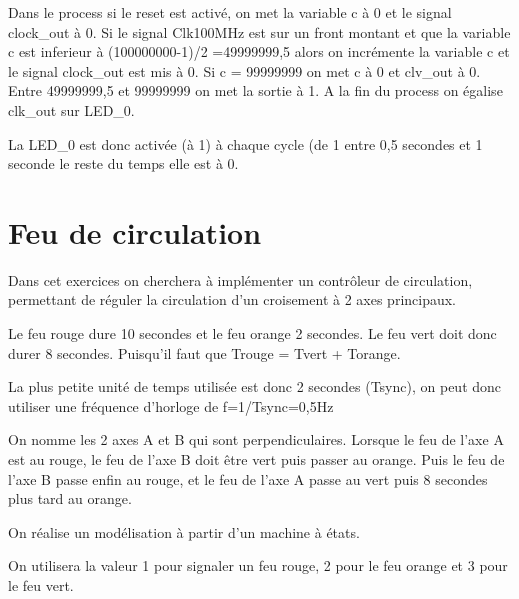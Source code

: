 \documentclass[11pt]{report}
\begin{document}
Dans le process si le reset est activé, on met la variable c à 0 et le signal clock\_out à 0. Si le signal Clk100MHz est sur un front montant et que la variable c est inferieur à (100000000-1)/2 =49999999,5 alors on incrémente la variable c et le signal clock\_out est mis à 0. Si c = 99999999 on met c à 0 et clv\_out à 0. Entre 49999999,5 et 99999999 on met la sortie à 1.
A la fin du process on égalise clk\_out sur LED\_0.

La LED\_0 est donc activée (à 1) à chaque cycle (de 1 entre 0,5 secondes et 1 seconde le reste du temps elle est à 0.


\section{Feu de circulation}

Dans cet exercices on cherchera à implémenter un contrôleur de circulation, permettant de réguler la circulation d'un croisement à 2 axes principaux.

Le feu rouge dure 10 secondes et le feu orange 2 secondes. Le feu vert doit donc durer 8 secondes. Puisqu'il faut que Trouge = Tvert + Torange.

La plus petite unité de temps utilisée est donc 2 secondes (Tsync), on  peut donc utiliser une fréquence d'horloge de f=1/Tsync=0,5Hz

On nomme les 2 axes A et B qui sont perpendiculaires. Lorsque le feu de l'axe A est au rouge, le feu de l'axe B doit être vert puis passer au orange. Puis le feu de l'axe B passe enfin au rouge, et le feu de l'axe A passe au vert puis 8 secondes plus tard au orange.

On réalise un modélisation à partir d'un machine à états.

On utilisera la valeur 1 pour signaler un feu rouge, 2 pour le feu orange et 3 pour le feu vert.
\end{document}
